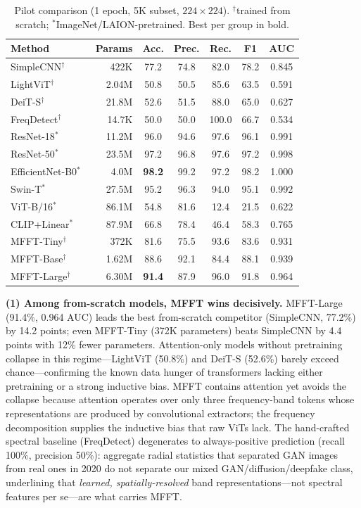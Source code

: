 \documentclass[journal]{IEEEtran}
\begin{document}
\begin{table}[!t]
\renewcommand{\arraystretch}{1.2}
\caption{Pilot comparison (1 epoch, 5K subset, $224\times224$). $^\dagger$trained from scratch; $^{*}$ImageNet/LAION-pretrained. Best per group in bold.}
\label{tab:main}
\centering
\setlength{\tabcolsep}{3.5pt}
\begin{tabular}{lrccccc}
\toprule
Method & Params & Acc. & Prec. & Rec. & F1 & AUC \\
\midrule
SimpleCNN$^\dagger$      & 422K   & 77.2 & 74.8 & 82.0 & 78.2 & 0.845 \\
LightViT$^\dagger$       & 2.04M  & 50.8 & 50.5 & 85.6 & 63.5 & 0.591 \\
DeiT-S$^\dagger$~\cite{touvron2021} & 21.8M  & 52.6 & 51.5 & 88.0 & 65.0 & 0.627 \\
FreqDetect$^\dagger$~\cite{frank2020} & 14.7K & 50.0 & 50.0 & 100.0 & 66.7 & 0.534 \\
\midrule
ResNet-18$^{*}$~\cite{he2016}    & 11.2M  & 96.0 & 94.6 & 97.6 & 96.1 & 0.991 \\
ResNet-50$^{*}$~\cite{he2016}    & 23.5M  & 97.2 & 96.8 & 97.6 & 97.2 & 0.998 \\
EfficientNet-B0$^{*}$~\cite{tan2019} & 4.0M & \textbf{98.2} & 99.2 & 97.2 & 98.2 & 1.000 \\
Swin-T$^{*}$~\cite{liu2021}      & 27.5M  & 95.2 & 96.3 & 94.0 & 95.1 & 0.992 \\
ViT-B/16$^{*}$~\cite{dosovitskiy2021} & 86.1M & 54.8 & 81.6 & 12.4 & 21.5 & 0.622 \\
CLIP+Linear$^{*}$~\cite{radford2021} & 87.9M & 66.8 & 78.4 & 46.4 & 58.3 & 0.765 \\
\midrule
MFFT-Tiny$^\dagger$  & 372K  & 81.6 & 75.5 & 93.6 & 83.6 & 0.931 \\
MFFT-Base$^\dagger$  & 1.62M & 88.6 & 92.1 & 84.4 & 88.1 & 0.939 \\
MFFT-Large$^\dagger$ & 6.30M & \textbf{91.4} & 87.9 & 96.0 & 91.8 & 0.964 \\
\bottomrule
\end{tabular}
\end{table}

\textbf{(1) Among from-scratch models, MFFT wins decisively.} MFFT-Large (91.4\%, 0.964 AUC) leads the best from-scratch competitor (SimpleCNN, 77.2\%) by 14.2 points; even MFFT-Tiny (372K parameters) beats SimpleCNN by 4.4 points with 12\% fewer parameters. Attention-only models without pretraining collapse in this regime---LightViT (50.8\%) and DeiT-S (52.6\%) barely exceed chance---confirming the known data hunger of transformers lacking either pretraining or a strong inductive bias. MFFT contains attention yet avoids the collapse because attention operates over only three frequency-band tokens whose representations are produced by convolutional extractors; the frequency decomposition supplies the inductive bias that raw ViTs lack. The hand-crafted spectral baseline (FreqDetect) degenerates to always-positive prediction (recall 100\%, precision 50\%): aggregate radial statistics that separated GAN images from real ones in 2020 do not separate our mixed GAN/diffusion/deepfake class, underlining that \emph{learned, spatially-resolved} band representations---not spectral features per se---are what carries MFFT.
\end{document}

